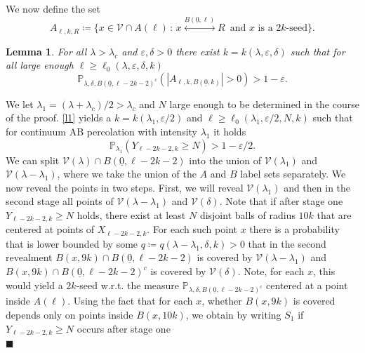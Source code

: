 \documentclass[11pt]{article}%
\newenvironment{proof}{\vspace{1ex}\noindent{\bf Proof.}}{\hspace*{\fill}$\blacksquare$\vspace{1ex}}
\newtheorem{lemma}[lemma]{Lemma}
\newcommand{\eps}{\varepsilon}
\newcommand{\Pro}{\mathbb{P}}
\newcommand{\typ}{\underline{0}}
\begin{document}
\noindent
We now define the set 
\begin{equation*}
	A_{\ell,k,R}\coloneqq\{x\in \mathcal{V}\cap A(\ell)\,:\, x\stackrel{B(\typ,\ell)}{\longleftrightarrow} R\, \text{ and }x \text{ is a }2k\text{-seed} \}.
\end{equation*}
\begin{lemma}\label{l2}
	For all $ \lambda>\lambda_c $ and $ \eps,\delta>0 $ there exist $ k=k(\lambda,\eps,\delta) $ such that for all large enough $ \ell\geq \ell_0(\lambda,\eps,\delta,k) $
	\begin{equation*}
		\Pro_{\lambda,\delta,B(\typ,\ell-2k-2)^c}(|A_{\ell,k,B(\typ,k)}|> 0)>1-\eps.
	\end{equation*}
\end{lemma}
\begin{proof}
	We let $ \lambda_1=(\lambda+\lambda_c)/2>\lambda_c $ and $ N $ large enough to be determined in the course of the proof. \cref{l1} yields a $ k=k(\lambda_1,\eps/2) $ and $ \ell\geq \ell_0(\lambda_1,\eps/2,N,k) $ such that for continuum AB percolation with intensity $ \lambda_1 $ it holds
	\begin{equation*}
		\Pro_{\lambda_1}(Y_{\ell-2k-2,k}\geq N)>1-\eps/2.
	\end{equation*}
We can split $ \mathcal{V}(\lambda)\cap B(\typ,\ell-2k-2) $ into the union of $ \mathcal{V}({\lambda_1})  $ and $ \mathcal{V}({\lambda-\lambda_1}) $, where we take the union of the $A$ and $B$ label sets separately. We now reveal the points in two steps. First, we will reveal $ \mathcal{V}({\lambda_1})  $ and then in the second stage all points of $ \mathcal{V}({\lambda-\lambda_1}) $ and $ \mathcal{V}(\delta) $. Note that if after stage one $ Y_{\ell-2k-2,k}\geq N $ holds, there exist at least $ N $ disjoint balls of radius $ 10k $ that are centered at points of $ X_{\ell-2k-2,k}$. For each such point $ x $ there is a probability that is lower bounded by some $ q\coloneqq q(\lambda-\lambda_1,\delta,k) >0$ that in the second revealment $ B(x,9k)\cap B(\typ,\ell-2k-2) $ is covered by $ \mathcal{V}(\lambda-\lambda_1) $ and $ B(x,
9k)\cap B(\typ,\ell-2k-2)^c $ is covered by $ \mathcal{V}(\delta) $. Note, for each $ x $, this would yield a $ 2k $-seed w.r.t. the measure $ \Pro_{\lambda,\delta,B(\typ,\ell-2k-2)^c} $ centered at a point inside $ A(\ell)$. Using the fact that for each $ x $, whether $B(x,9k)$ is covered depends only on points inside $B(x,10k)$, we obtain by writing $ S_1 $ if $ Y_{\ell-2k-2,k}\geq N $ occurs after stage one
\begin{equation*}

\end{equation*}
\end{proof}
\end{document}
